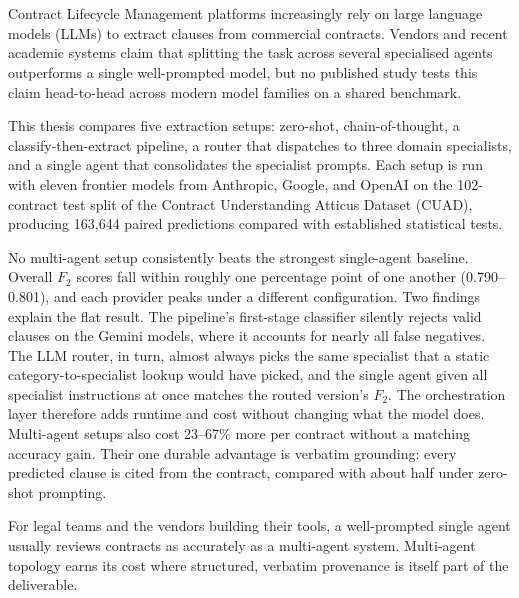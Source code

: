 \chapter{\abstractname}

Contract Lifecycle Management platforms increasingly rely on large language
models (LLMs) to extract clauses from commercial contracts. Vendors and recent
academic systems claim that splitting the task across several specialised agents
outperforms a single well-prompted model, but no published study tests this
claim head-to-head across modern model families on a shared benchmark.

This thesis compares five extraction setups: zero-shot, chain-of-thought, a
classify-then-extract pipeline, a router that dispatches to three domain
specialists, and a single agent that consolidates the specialist prompts.
Each setup is run with eleven frontier models from Anthropic, Google, and
OpenAI on the 102-contract test split of the Contract Understanding Atticus
Dataset (CUAD), producing 163{,}644 paired predictions compared with
established statistical tests.

No multi-agent setup consistently beats the strongest single-agent baseline.
Overall $F_2$ scores fall within roughly one percentage point of one another
(0.790--0.801), and each provider peaks under a different configuration.
Two findings explain the flat result. The pipeline's first-stage classifier
silently rejects valid clauses on the Gemini models, where it accounts for
nearly all false negatives. The LLM router, in turn, almost always
picks the same specialist that a static category-to-specialist lookup would
have picked, and the single agent given all specialist instructions at once
matches the routed version's $F_2$. The orchestration layer therefore adds
runtime and cost without changing what the model does. Multi-agent setups also cost 23--67\% more per
contract without a matching accuracy gain. Their one durable advantage is
verbatim grounding: every predicted clause is cited from the contract,
compared with about half under zero-shot prompting.

\medskip
\noindent
For legal teams and the vendors building their tools, a well-prompted single agent usually reviews contracts as accurately as a multi-agent system. Multi-agent topology earns its cost where structured, verbatim provenance is itself part of the deliverable.
